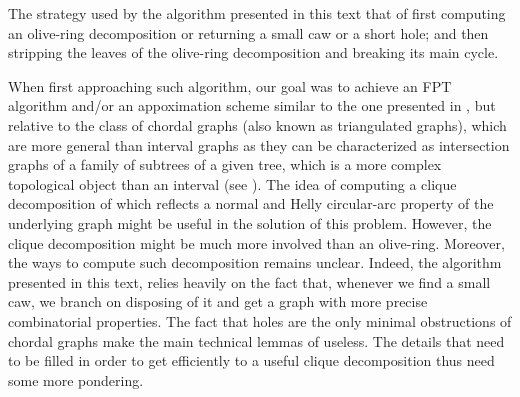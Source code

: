 \documentclass{article}
\begin{document}
    The strategy used by
    the algorithm presented in
    this text that of first
    computing an olive-ring
    decomposition or returning
    a small caw or a short hole;
    and then
    stripping the leaves
    of the olive-ring decomposition
    and breaking its main cycle.

    When first approaching
    such algorithm, our
    goal was to achieve
    an FPT algorithm and/or an appoximation 
    scheme similar
    to the one presented in \cite{main},
    but relative to the 
    class of chordal graphs
    (also known as triangulated graphs),
    which are more general than
    interval graphs as they
    can be characterized as
    intersection graphs of 
    a family of subtrees of a given tree,
    which is a more complex
    topological object than
    an interval (see \cite{book}).
    The idea of computing
    a clique decomposition
    of which
    reflects a
    normal and Helly circular-arc
    property of the underlying
    graph might be
    useful in the solution
    of this problem.
    However, the clique
    decomposition
    might be much more
    involved than an olive-ring.
    Moreover, the ways
    to compute such decomposition
    remains unclear. 
    Indeed, the algorithm
    presented in this
    text, relies heavily
    on the fact that,
    whenever we find a small
    caw, we branch on
    disposing of it
    and get a graph
    with more precise
    combinatorial properties.
    The fact that holes
    are the only minimal
    obstructions of
    chordal graphs
    make the main
    technical lemmas
    of \cite{main}
    useless. The details
    that need to be filled
    in order to get
    efficiently to 
    a useful clique
    decomposition thus need
    some more pondering.

    \printbibliography
\end{document}
